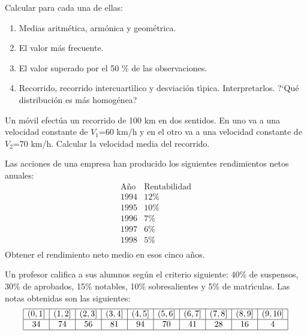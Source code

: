 \documentclass[hidequestions]{homework}
\begin{document}
	Calcular para cada una de ellas:
	\begin{enumerate}
		\item Medias aritm{\'e}tica, arm{\'o}nica y geom{\'e}trica.
		\item El valor m{\'a}s frecuente.
		\item El valor superado por el 50 \% de las observaciones.
		\item Recorrido,   recorrido   intercuart{\'\i}lico   y   desviaci{\'o}n t{\'\i}pica.
		Interpretarlos. ?`Qu{\'e} distribuci{\'o}n es m{\'a}s homog{\'e}nea? \\
	\end{enumerate}
	\color{black}
	
	
	
	
	\problem
	Un m{\'o}vil efect{\'u}a un recorrido de 100 km en dos sentidos. En
	uno  va a
	una velocidad constante de $V_1$=60 km/h y en el otro va a una velocidad
	constante de $V_2$=70 km/h. Calcular la velocidad media del recorrido. \\
	\newline
	\color{black}
	
	
	
	
	\problem
	Las acciones de una empresa han producido los  siguientes  rendimientos
	netos anuales:
	$$
	\begin{array}{cc}
	\mbox{A{\~n}o} & \mbox{Rentabilidad} \\ \hline
	1994  &        12\%     \\
	1995  &        10\%     \\
	1996  &         7\%     \\
	1997  &         6\%     \\
	1998  &         5\%     \\
	\end{array}
	$$
	Obtener el rendimiento neto medio en esos cinco a{\~n}os. \\

	\newline

	\color{black}
	
	
	
	
	\problem
	Un profesor califica a sus alumnos seg{\'u}n el criterio siguiente: 40\%  de
	suspensos, 30\% de aprobados, 15\% notables, 10\% sobresalientes y  5\%  de
	matr{\'\i}culas. Las notas obtenidas son las si\-guien\-tes:
	$$
	\begin{array}{|c|c|c|c|c|c|c|c|c|c|} \hline
	(0,1] & (1,2] & (2,3] & (3,4] & (4,5] & (5,6] & (6,7] & (7,8] & (8,9] & (9,10] \\ \hline
	34 & 74  & 56  &  81 &  94 &  70 &  41 &  28 &  16 &  4  \\ \hline
	\end{array}
	$$
	
\end{document}
